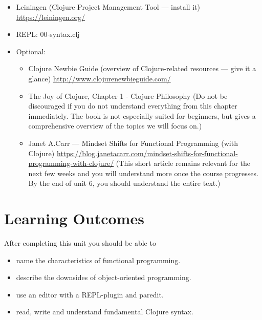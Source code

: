 \documentclass[11pt,a4paper]{article}
\begin{document}
	\begin{itemize}
        \item Leiningen (Clojure Project Management Tool --- install it) \url{https://leiningen.org/}
        \item REPL: 00-syntax.clj
        \item Optional:
            \begin{itemize}
                \item Clojure Newbie Guide (overview of Clojure-related resources --- give it a glance) \url{http://www.clojurenewbieguide.com/}
                \item The Joy of Clojure, Chapter 1 - Clojure Philosophy 
                    (Do not be discouraged if you do not understand everything from this chapter immediately.
                    The book is not especially suited for beginners, but gives a comprehensive overview of the topics we will focus on.)
                \item Janet A.\@ Carr --- Mindset Shifts for Functional Programming (with Clojure) \url{https://blog.janetacarr.com/mindset-shifts-for-functional-programming-with-clojure/}
                    (This short article remains relevant for the next few weeks and you will understand more once the course progresses. By the end of unit 6, you should understand the entire text.)
            \end{itemize}
	\end{itemize}
	
	
	\section{Learning Outcomes}
	
	After completing this unit you should be able to
	
	\begin{itemize}
		\item name the characteristics of functional programming.
		\item describe the downsides of object-oriented programming.
		\item use an editor with a REPL-plugin and paredit.
        \item read, write and understand fundamental Clojure syntax.
	\end{itemize}
	
\end{document}
